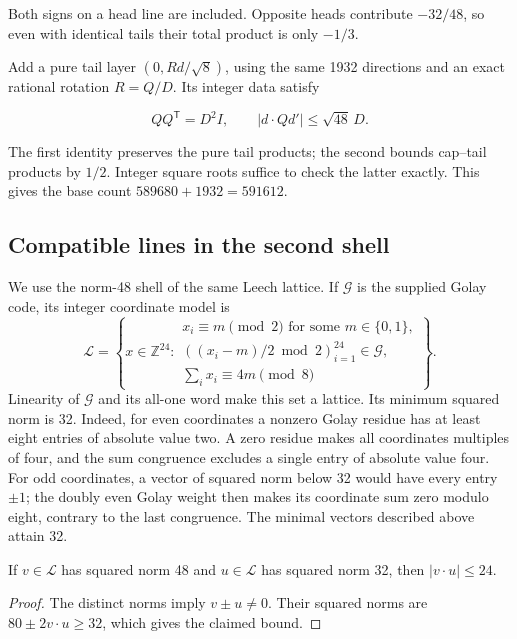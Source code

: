 Both signs on a head line are included. Opposite heads contribute $-32/48$,
so even with identical tails their total product is only $-1/3$.

Add a pure tail layer \((0,Rd/\sqrt8)\), using the same 1932 directions
and an exact rational rotation \(R=Q/D\). Its integer data satisfy

\[
QQ^{\mathsf T}=D^2I,\qquad
|d\cdot Qd'|\le\sqrt{48}\,D.
\]

The first identity preserves the pure tail products; the second bounds
cap--tail products by \(1/2\). Integer square roots suffice to check the
latter exactly. This gives the base count \(589680+1932=591612\).

\subsection{Compatible lines in the second shell}

We use the norm-48 shell of the same Leech lattice. If $\mathcal G$ is the
supplied Golay code, its integer coordinate model is
\begin{equation}
\mathcal L=\left\{x\in\mathbb Z^{24}:\begin{array}{l}
x_i\equiv m\pmod2\text{ for some }m\in\{0,1\},\\
((x_i-m)/2\bmod2)_{i=1}^{24}\in\mathcal G,\\
\sum_i x_i\equiv4m\pmod8
\end{array}\right\}.
\label{eq:leech-membership}
\end{equation}
Linearity of $\mathcal G$ and its all-one word make this set a lattice.
Its minimum squared norm is 32. Indeed, for even coordinates a nonzero
Golay residue has at least eight entries of absolute value two. A zero
residue makes all coordinates multiples of four, and the sum congruence
excludes a single entry of absolute value four. For odd coordinates, a
vector of squared norm below 32 would have every entry $\pm1$; the
doubly even Golay weight then makes its coordinate sum zero modulo eight,
contrary to the last congruence. The minimal vectors described above
attain 32.

\begin{lemma}
\label{lem:second-shell}
If $v\in\mathcal L$ has squared norm 48 and $u\in\mathcal L$ has
squared norm 32, then $|v\cdot u|\le24$.
\end{lemma}
\begin{proof}
The distinct norms imply $v\pm u\ne0$. Their squared norms are
$80\pm2v\cdot u\ge32$, which gives the claimed bound.
\end{proof}

